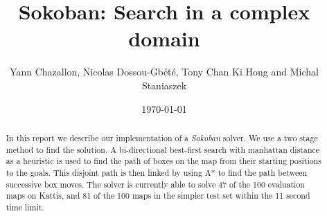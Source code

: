 \documentclass[a4paper,11pt]{article}
\title{Sokoban: Search in a complex domain}
\author{Yann Chazallon,  Nicolas Dossou-Gb{\'e}t{\'e}, Tony Chan Ki Hong and Michal Staniaszek}
\date{\today}
\begin{document}
\maketitle

\begin{abstract}
  In this report we describe our implementation of a \emph{Sokoban} solver. We
  use a two stage method to find the solution. A bi-directional best-first
  search with manhattan distance as a heuristic is used to find the path of
  boxes on the map from their starting positions to the goals. This disjoint
  path is then linked by using A* to find the path between successive box
  moves. The solver is currently able to solve 47 of the 100 evaluation maps on
  Kattis, and 81 of the 100 maps in the simpler test set within the 11 second
  time limit.
\end{abstract}

\begin{figure}[!ht]
  \captionsetup[subfigure]{labelformat=empty}
  \centering
  \quad
  \quad
  \quad
\end{figure}
\end{document}
